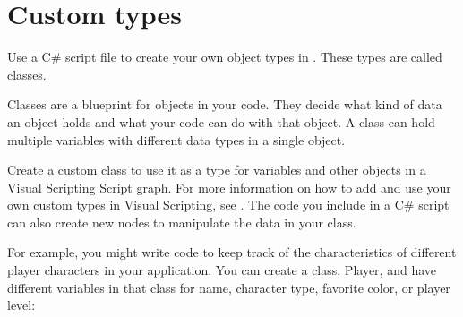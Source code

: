\chapter{Custom types}
\hypertarget{md__library_2_package_cache_2com_8unity_8visualscripting_0d1_89_82_2_documentation_0i_2vs-custom-types}{}\label{md__library_2_package_cache_2com_8unity_8visualscripting_0d1_89_82_2_documentation_0i_2vs-custom-types}
\label{md__library_2_package_cache_2com_8unity_8visualscripting_0d1_89_82_2_documentation_0i_2vs-custom-types_autotoc_md1819}%
%
 Use a C\# script file to create your own object types in . These types are called classes.

Classes are a blueprint for objects in your code. They decide what kind of data an object holds and what your code can do with that object. A class can hold multiple variables with different data types in a single object.

Create a custom class to use it as a type for variables and other objects in a Visual Scripting Script graph. For more information on how to add and use your own custom types in Visual Scripting, see . The code you include in a C\# script can also create new nodes to manipulate the data in your class.

For example, you might write code to keep track of the characteristics of different player characters in your application. You can create a class, {\ttfamily Player}, and have different variables in that class for name, character type, favorite color, or player level\+:


